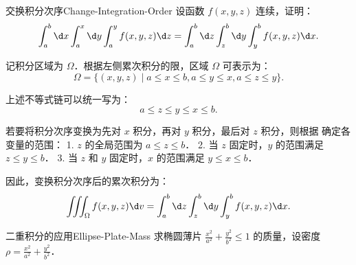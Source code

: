 \begin{problem}{交换积分次序}{Change-Integration-Order}
    设函数 $f(x, y, z)$ 连续，证明：
    \begin{equation}
        \int_a^b \d x \int_a^x \d y \int_a^y f(x, y, z) \d z = \int_a^b \d z \int_z^b \d y \int_y^b f(x, y, z) \d x.
    \end{equation}
\end{problem}

\begin{myproof}
    记积分区域为 $\Omega$．根据左侧累次积分的限，区域 $\Omega$ 可表示为：
    \begin{equation}
        \Omega = \{ (x, y, z) \mid a \le x \le b, a \le y \le x, a \le z \le y \}.
    \end{equation}

    上述不等式链可以统一写为：
    \begin{equation}
        a \le z \le y \le x \le b.
        \label{eq:chain-ineq}
    \end{equation}

    若要将积分次序变换为先对 $x$ 积分，再对 $y$ 积分，最后对 $z$ 积分，则根据  确定各变量的范围：
    1. $z$ 的全局范围为 $a \le z \le b$．
    2. 当 $z$ 固定时，$y$ 的范围满足 $z \le y \le b$．
    3. 当 $z$ 和 $y$ 固定时，$x$ 的范围满足 $y \le x \le b$．

    因此，变换积分次序后的累次积分为：
    \begin{equation}
        \iiint_{\Omega} f(x, y, z) \d v = \int_a^b \d z \int_z^b \d y \int_y^b f(x, y, z) \d x.
    \end{equation}
\end{myproof}

\begin{problem}{二重积分的应用}{Ellipse-Plate-Mass}
    求椭圆薄片 $\frac{x^2}{a^2} + \frac{y^2}{b^2} \le 1$ 的质量，设密度 $\rho = \frac{x^2}{a^2} + \frac{y^2}{b^2}$．
\end{problem}


